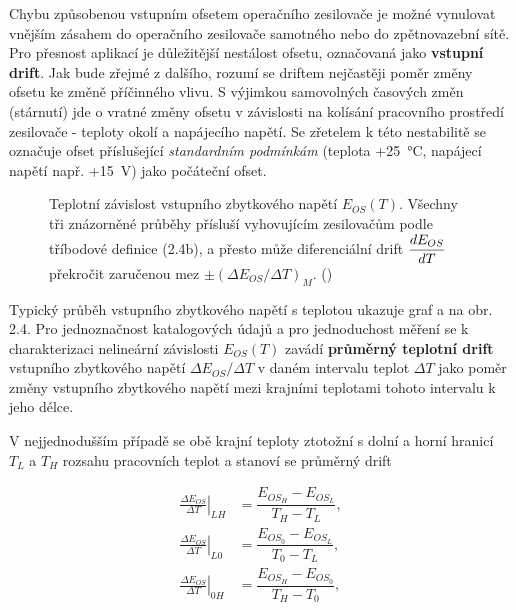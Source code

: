         Chybu způsobenou vstupním ofsetem operačního zesilovače je možné vynulovat vnějším zásahem
        do operačního zesilovače samotného nebo do zpětnovazební sítě. Pro přesnost aplikací je
        důležitější nestálost ofsetu, označovaná jako \textbf{vstupní drift}. Jak bude zřejmé z
        dalšího, rozumí se driftem nejčastěji poměr změny ofsetu ke změně příčinného vlivu. S
        výjimkou samovolných časových změn (stárnutí) jde o vratné změny ofsetu v závislosti na
        kolísání pracovního prostředí zesilovače - teploty okolí a napájecího napětí. Se zřetelem k
        této nestabilitě se označuje ofset příslušející \emph{standardním podmínkám} (teplota
        +\SI{25}{\degreeCelsius}, napájecí napětí např. +\SI{15}{\V}) jako počáteční ofset.
        
        \begin{figure}[ht!] %
          \centering
          \caption{Teplotní závislost vstupního zbytkového napětí \(E_{OS}(T)\). Všechny tři
                  znázorněné průběhy přísluší vyhovujícím zesilovačům podle tříbodové definice
                  (2.4b), a přesto může diferenciální drift \(\dfrac{d E_{OS}}{d T}\) překročit zaručenou
                  mez \(\pm(\Delta E_{OS}/\Delta T)_M\). (\cite[s.~17]{Dostal})}
          \label{aes:fig049}
        \end{figure}

        Typický průběh vstupního zbytkového napětí s teplotou ukazuje graf a na obr. 2.4. Pro
        jednoznačnost katalogových údajů a pro jednoduchost měření se k charakterizaci nelineární
        závislosti \(E_{OS}(T)\) zavádí \textbf{průměrný teplotní drift} vstupního zbytkového napětí
        \(\Delta E_{OS}/\Delta T\) v daném intervalu teplot \(\Delta T\) jako poměr změny vstupního
        zbytkového napětí mezi krajními teplotami tohoto intervalu k jeho délce.   
        
        V nejjednodušším případě se obě krajní teploty ztotožní s dolní a horní hranicí \(T_L\) a
        \(T_H\) rozsahu pracovních teplot a stanoví se průměrný drift

        \begin{subequations}\label{aes:eq039}
          \begin{align}
            \left.\frac{\Delta E_{OS}}{\Delta T}\right\rvert_{LH} &= 
                                    \dfrac{E_{OS_H} - E_{OS_L}}{T_H - T_L}, \label{aes:eq039a} \\
            \left.\frac{\Delta E_{OS}}{\Delta T}\right\rvert_{L0} &= 
                                    \dfrac{E_{OS_0} - E_{OS_L}}{T_0 - T_L}, \label{aes:eq039b} \\
            \left.\frac{\Delta E_{OS}}{\Delta T}\right\rvert_{0H} &= 
                                    \dfrac{E_{OS_H} - E_{OS_0}}{T_H - T_0}, \label{aes:eq039c}
          \end{align}
        \end{subequations}

